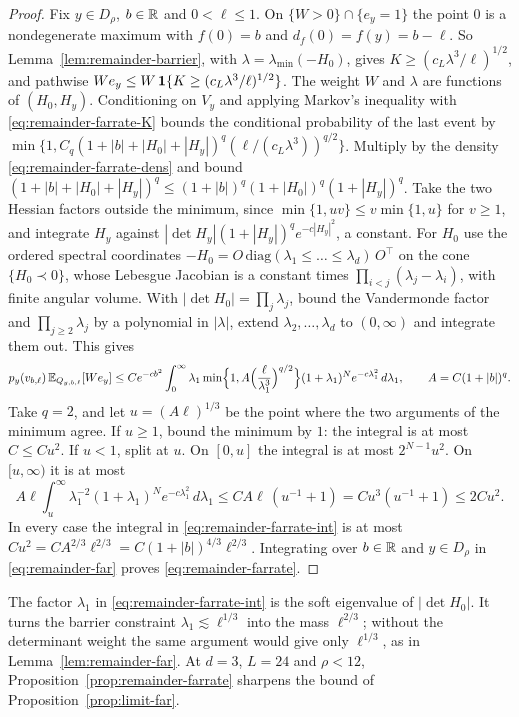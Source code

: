 \begin{proof}
Fix $y\in D_\rho$, $b\in\mathbb R$ and $0<\ell\le1$. On $\{W>0\}\cap\{e_y=1\}$ the point $0$ is a nondegenerate maximum with $f(0)=b$ and $d_f(0)=f(y)=b-\ell$. So Lemma~\ref{lem:remainder-barrier}, with $\lambda=\lambda_{\min}(-H_0)$, gives $K\ge(c_L\lambda^3/\ell)^{1/2}$, and pathwise $We_y\le W\,\mathbf 1\{K\ge(c_L\lambda^3/\ell)^{1/2}\}$. The weight $W$ and $\lambda$ are functions of $(H_0,H_y)$. Conditioning on $V_y$ and applying Markov's inequality with \eqref{eq:remainder-farrate-K} bounds the conditional probability of the last event by $\min\{1,C_q(1+|b|+|H_0|+|H_y|)^q(\ell/(c_L\lambda^3))^{q/2}\}$. Multiply by the density \eqref{eq:remainder-farrate-dens} and bound $(1+|b|+|H_0|+|H_y|)^q\le(1+|b|)^q(1+|H_0|)^q(1+|H_y|)^q$. Take the two Hessian factors outside the minimum, since $\min\{1,uv\}\le v\min\{1,u\}$ for $v\ge1$, and integrate $H_y$ against $|\det H_y|(1+|H_y|)^qe^{-c|H_y|^2}$, a constant. For $H_0$ use the ordered spectral coordinates $-H_0=O\,\mathrm{diag}(\lambda_1\le\dots\le\lambda_d)\,O^{\top}$ on the cone $\{H_0\prec0\}$, whose Lebesgue Jacobian is a constant times $\prod_{i<j}(\lambda_j-\lambda_i)$, with finite angular volume. With $|\det H_0|=\prod_j\lambda_j$, bound the Vandermonde factor and $\prod_{j\ge2}\lambda_j$ by a polynomial in $|\lambda|$, extend $\lambda_2,\dots,\lambda_d$ to $(0,\infty)$ and integrate them out. This gives
\begin{equation}\label{eq:remainder-farrate-int}
p_y(v_{b,\ell})\,\mathbb E_{Q_{y,b,\ell}}[We_y]\le Ce^{-cb^2}\int_0^\infty\lambda_1\min\Bigl\{1,A\Bigl(\frac{\ell}{\lambda_1^3}\Bigr)^{q/2}\Bigr\}(1+\lambda_1)^Ne^{-c\lambda_1^2}\,d\lambda_1,\qquad A=C(1+|b|)^q .
\end{equation}
Take $q=2$, and let $u=(A\ell)^{1/3}$ be the point where the two arguments of the minimum agree. If $u\ge1$, bound the minimum by $1$: the integral is at most $C\le Cu^2$. If $u<1$, split at $u$. On $[0,u]$ the integral is at most $2^{N-1}u^2$. On $[u,\infty)$ it is at most
\[
A\ell\int_u^\infty\lambda_1^{-2}(1+\lambda_1)^Ne^{-c\lambda_1^2}\,d\lambda_1\le CA\ell\,(u^{-1}+1)=Cu^3(u^{-1}+1)\le2Cu^2 .
\]
In every case the integral in \eqref{eq:remainder-farrate-int} is at most $Cu^2=CA^{2/3}\ell^{2/3}=C(1+|b|)^{4/3}\ell^{2/3}$. Integrating over $b\in\mathbb R$ and $y\in D_\rho$ in \eqref{eq:remainder-far} proves \eqref{eq:remainder-farrate}.
\end{proof}

The factor $\lambda_1$ in \eqref{eq:remainder-farrate-int} is the soft eigenvalue of $|\det H_0|$. It turns the barrier constraint $\lambda_1\lesssim\ell^{1/3}$ into the mass $\ell^{2/3}$; without the determinant weight the same argument would give only $\ell^{1/3}$, as in Lemma~\ref{lem:remainder-far}. At $d=3$, $L=24$ and $\rho<12$, Proposition~\ref{prop:remainder-farrate} sharpens the bound of Proposition~\ref{prop:limit-far}.

